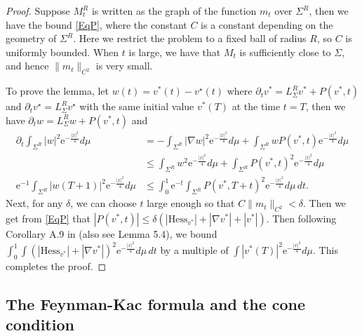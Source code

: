 \documentclass[12pt]{amsart}
\numberwithin{equation}{section}
\numberwithin{equation}{section}
\newcommand{\dt}{\delta}
\begin{document}
	\begin{proof}
		Suppose $M^R_t$ is written as the graph of the function $m_t$ over $\Sigma^R$, then we have the bound \eqref{EqP}, where the constant $C$ is a constant depending on the geometry of $\Sigma^R$. Here we restrict the problem to a fixed ball of radius $R$, so $C$ is uniformly bounded. 
		When $t$ is large, we have that $M_t$ is sufficiently close to $\Sigma$, and hence $\|m_t\|_{C^2}$ is very small.
		
		To prove the lemma, let $w(t)=v^*(t)-v^\star(t)$ where $\partial_tv^*=L_\Sigma^R v^*+P(v^*,t)$ and $\partial_tv^\star=L_\Sigma^R v^\star$ with the same initial value $v^*(T)$ at the time $t=T$, then we have $\partial_t w=L_\Sigma^R w+P(v^*,t)$ and 
		\begin{equation*}
			\begin{aligned}
				\partial_t\int_{\Sigma^R} |w|^2 \mathrm{e}^{-\frac{|x|^2}{4}}d\mu&=-\int_{\Sigma^R}  |\nabla w|^2  \mathrm{e}^{-\frac{|x|^2}{4}}d\mu+\int_{\Sigma^R}  wP(v^*,t)  \mathrm{e}^{-\frac{|x|^2}{4}}d\mu\\
				&\leq \int_{\Sigma^R}  w^2  \mathrm{e}^{-\frac{|x|^2}{4}}d\mu+\int_{\Sigma^R}  P(v^*,t)^2  \mathrm{e}^{-\frac{|x|^2}{4}}d\mu\\
				\mathrm{e}^{-1}\int_{\Sigma^R}  |w(T+1)|^2 \mathrm{e}^{-\frac{|x|^2}{4}}d\mu&\leq \int_0^1 \mathrm{e}^{-t} \int_{\Sigma^R}  P(v^*,T+t)^2  \mathrm{e}^{-\frac{|x|^2}{4}}d\mu\,dt.
			\end{aligned}
		\end{equation*}
		Next,  for any $\dt$, we can choose $t$ large enough so that $C\|m_t\|_{C^2}<\dt$. Then  we get from \eqref{EqP} that $|P(v^*,t)|\leq \dt(|\mathrm{Hess}_{v^*}|+|\nabla v^*|+|v^*|)$. Then following Corollary A.9 in \cite{SX} (also see \cite{CM2} Lemma 5.4), we bound 
		$\int_0^1\int (|\mathrm{Hess}_{v^*}|+|\nabla v^*|)^2\mathrm{e}^{-\frac{|x|^2}{4}}d\mu\,dt$ by a multiple of $\int |v^*(T)|^2\mathrm{e}^{-\frac{|x|^2}{4}}d\mu$. This completes the proof. 
	\end{proof}
	
	\subsection{The Feynman-Kac formula and the cone condition}\label{SSFKCone}
	
\end{document}
